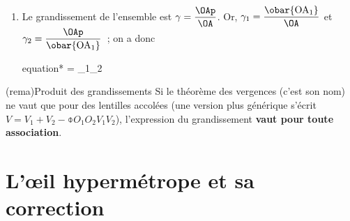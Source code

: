 \documentclass[../../main/main.tex]{subfiles}
\begin{document}
{\begin{enumerate}
\begin{enumerate}
			      \item Ou directement dans~\ref{eq:vaccol} ajouter et retirer
			            $\frac{1}{\obar{\rm OA_1}}$ dans le terme de droite.
		      \end{enumerate}
		      Quoiqu'il en soit, on trouve rapidement
		      \begin{align*}
			      \frac{1}{\OFp} & =
			      \frac{1}{\obar{\rm OF'_1}} + \frac{1}{\obar{\rm OF'_2}}
			      \\\Leftrightarrow
			      V              & = V_1 + V_2
		      \end{align*}
		\item Le grandissement de l'ensemble est $\gamma =
			      \dfrac{\OAp}{\OA}$. Or, $\gamma_1 =
			      \dfrac{\obar{\rm OA_1}}{\OA}$ et
		      $\gamma_2 = \dfrac{\OAp}{\obar{\rm OA_1}}$~; on a donc
		      \begin{empheq}[box=\fbox]{equation*}
			      \gamma = \gamma_1\gamma_2
		      \end{empheq}
	\end{enumerate}
	\begin{tcb}[label=rema:prod_gamma](rema){Produit des grandissements}
		Si le théorème des vergences (c'est son nom) ne vaut que pour des lentilles
		accolées (une version plus générique s'écrit $V = V_1 + V_2 -
			\obar{O_1O_2}V_1V_2$), l'expression du grandissement \textbf{vaut pour toute
			association}.
	\end{tcb}
}

\section{L'œil hypermétrope et sa correction}
\end{document}
